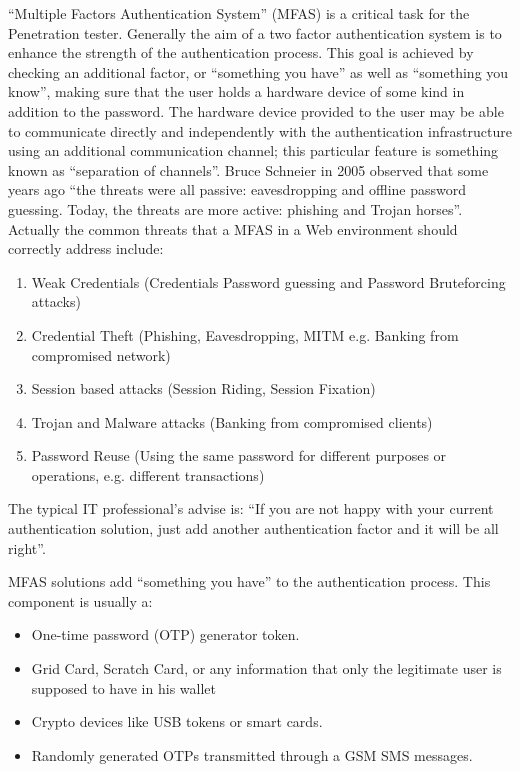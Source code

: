 	“Multiple Factors Authentication System” (MFAS) is a critical task for the Penetration tester.
	Generally the aim of a two factor authentication system is to enhance the strength of the 
	authentication process. This goal is achieved by checking an additional factor, or “something 
	you have” as well as “something you know”, making sure that the user holds a hardware device of 
	some kind in addition to the password. The hardware device provided to the user may be able to
	communicate directly and independently with the authentication infrastructure using an additional
	communication channel; this particular feature is something known as “separation of channels”.
	Bruce Schneier in 2005 observed that some years ago “the threats were all passive: eavesdropping 
	and offline password guessing. Today, the threats are more active: phishing and Trojan horses”. 
	Actually the common threats that a MFAS in a Web environment should correctly address include:
		\begin{enumerate}
			\item Weak Credentials (Credentials Password guessing and Password Bruteforcing attacks)
			\item Credential Theft (Phishing, Eavesdropping, MITM e.g. Banking from compromised network)
			\item Session based attacks (Session Riding, Session Fixation)
			\item Trojan and Malware attacks (Banking from compromised clients)
			\item Password Reuse (Using the same password for different purposes or operations, 
			e.g. different transactions)
		\end{enumerate}

	The typical IT professional’s advise is: “If you are not happy with your current
	authentication solution, just add another authentication factor and it will be all right”.

	MFAS solutions add “something you have” to the authentication process. This component is usually a:
		\begin{itemize}
			\item One-time password (OTP) generator token.
			\item Grid Card, Scratch Card, or any information that only the legitimate user is 
			supposed to have in his wallet
			\item Crypto devices like USB tokens or smart cards.
			\item Randomly generated OTPs transmitted through a GSM SMS messages.
		\end{itemize}

